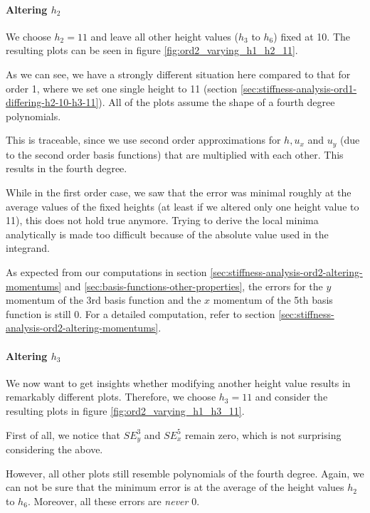 \documentclass{article}
\begin{document}
\paragraph{\texorpdfstring{Altering $h_2$}{Altering h2}}

We choose $h_2=11$ and leave all other height values ($h_3$ to $h_6$) fixed at 10. The resulting plots can be seen in figure \ref{fig:ord2_varying_h1_h2_11}.



As we can see, we have a strongly different situation here compared to that for order 1, where we set one single height to 11 (section \ref{sec:stiffness-analysis-ord1-differing-h2-10-h3-11}). All of the plots assume the shape of a fourth degree polynomials.

This is traceable, since we use second order approximations for $h, u_x$ and $u_y$ (due to the second order basis functions) that are multiplied with each other. This results in the fourth degree.

While in the first order case, we saw that the error was minimal roughly at the average values of the fixed heights (at least if we altered only one height value to 11), this does not hold true anymore. Trying to derive the local minima analytically is made too difficult because of the absolute value used in the integrand.

As expected from our computations in section \ref{sec:stiffness-analysis-ord2-altering-momentums} and \ref{sec:basis-functions-other-properties}, the errors for the $y$ momentum of the 3rd basis function and the $x$ momentum of the 5th basis function is still 0. For a detailed computation, refer to section \ref{sec:stiffness-analysis-ord2-altering-momentums}.

\paragraph{\texorpdfstring{Altering $h_3$}{Altering h3}}

We now want to get insights whether modifying another height value results in remarkably different plots. Therefore, we choose $h_3=11$ and consider the resulting plots in figure \ref{fig:ord2_varying_h1_h3_11}.



First of all, we notice that $SE_y^3$ and $SE_x^5$ remain zero, which is not surprising considering the above.

However, all other plots still resemble polynomials of the fourth degree. Again, we can not be sure that the minimum error is at the average of the height values $h_2$ to $h_6$. Moreover, all these errors are \emph{never} 0.
\end{document}
